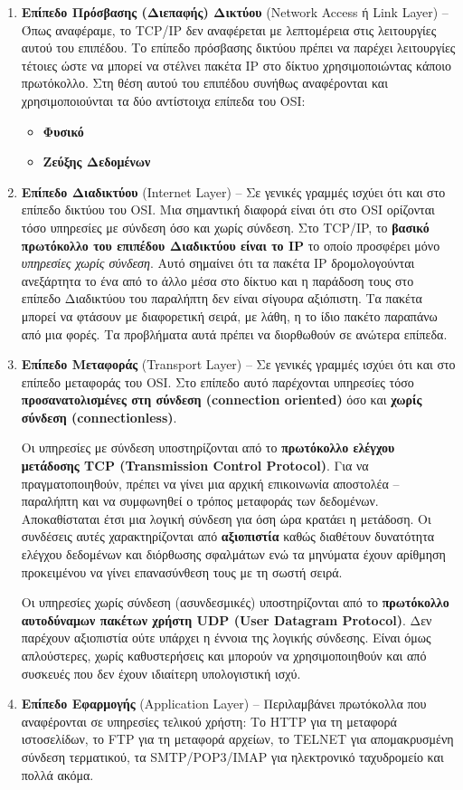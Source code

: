 \begin{enumerate}
\item \textbf{Επίπεδο Πρόσβασης (Διεπαφής) Δικτύου} (Network Access ή Link Layer) -- Όπως αναφέραμε, το TCP/IP δεν αναφέρεται με λεπτομέρεια στις λειτουργίες αυτού του επιπέδου. Το επίπεδο πρόσβασης δικτύου πρέπει να παρέχει λειτουργίες τέτοιες ώστε να μπορεί να στέλνει πακέτα IP στο δίκτυο χρησιμοποιώντας κάποιο πρωτόκολλο. Στη θέση αυτού του επιπέδου συνήθως αναφέρονται και χρησιμοποιούνται τα δύο αντίστοιχα επίπεδα του OSI:
  \begin{itemize}
     \item \textbf{Φυσικό}
     \item \textbf{Ζεύξης Δεδομένων}
  \end{itemize}
\item \textbf{Επίπεδο Διαδικτύου} (Internet Layer) -- Σε γενικές γραμμές ισχύει ότι και στο επίπεδο δικτύου του OSI. Μια σημαντική διαφορά είναι ότι στο OSI ορίζονται τόσο υπηρεσίες με σύνδεση όσο και χωρίς σύνδεση. Στο TCP/IP, το \textbf{βασικό πρωτόκολλο του επιπέδου Διαδικτύου είναι το IP} το οποίο προσφέρει μόνο \emph{υπηρεσίες χωρίς σύνδεση}. Αυτό σημαίνει ότι τα πακέτα IP δρομολογούνται ανεξάρτητα το ένα από το άλλο μέσα στο δίκτυο και η παράδοση τους στο επίπεδο Διαδικτύου του παραλήπτη δεν είναι σίγουρα αξιόπιστη. Τα πακέτα μπορεί να φτάσουν με διαφορετική σειρά, με λάθη, η το ίδιο πακέτο παραπάνω από μια φορές. Τα προβλήματα αυτά πρέπει να διορθωθούν σε ανώτερα επίπεδα.
\item \textbf{Επίπεδο Μεταφοράς} (Transport Layer) -- Σε γενικές γραμμές ισχύει ότι και στο επίπεδο μεταφοράς του OSI. Στο επίπεδο αυτό παρέχονται υπηρεσίες τόσο \textbf{προσανατολισμένες στη σύνδεση (connection oriented)} όσο και \textbf{χωρίς σύνδεση (connectionless)}.

Οι υπηρεσίες με σύνδεση υποστηρίζονται από το \textbf{πρωτόκολλο ελέγχου μετάδοσης TCP (Transmission Control Protocol)}. Για να πραγματοποιηθούν, πρέπει να γίνει μια αρχική επικοινωνία αποστολέα -- παραλήπτη και να συμφωνηθεί ο τρόπος μεταφοράς των δεδομένων. Αποκαθίσταται έτσι μια λογική σύνδεση για όση ώρα κρατάει η μετάδοση. Οι συνδέσεις αυτές χαρακτηρίζονται από \textbf{αξιοπιστία} καθώς διαθέτουν δυνατότητα ελέγχου δεδομένων και διόρθωσης σφαλμάτων ενώ τα μηνύματα έχουν αρίθμηση προκειμένου να γίνει επανασύνθεση τους με τη σωστή σειρά. 

Οι υπηρεσίες χωρίς σύνδεση (ασυνδεσμικές) υποστηρίζονται από το \textbf{πρωτόκολλο αυτοδύναμων πακέτων χρήστη UDP (User Datagram Protocol)}. Δεν παρέχουν αξιοπιστία ούτε υπάρχει η έννοια της λογικής σύνδεσης. Είναι όμως απλούστερες, χωρίς καθυστερήσεις και μπορούν να χρησιμοποιηθούν και από συσκευές που δεν έχουν ιδιαίτερη υπολογιστική ισχύ.
\item \textbf{Επίπεδο Εφαρμογής} (Application Layer) -- Περιλαμβάνει πρωτόκολλα που αναφέρονται σε υπηρεσίες τελικού χρήστη: Το HTTP για τη μεταφορά ιστοσελίδων, το FTP για τη μεταφορά αρχείων, το TELNET για απομακρυσμένη σύνδεση τερματικού, τα SMTP/POP3/IMAP για ηλεκτρονικό ταχυδρομείο και πολλά ακόμα. 
\end{enumerate}


